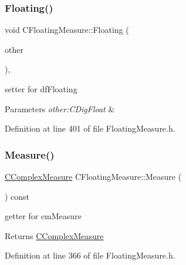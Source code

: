 \subsubsection{\texorpdfstring{Floating()}{Floating()}\hspace{0.1cm}{\footnotesize\ttfamily [2/2]}}
{\footnotesize\ttfamily void C\+Floating\+Measure\+::\+Floating (\begin{DoxyParamCaption}\item[{const \hyperlink{classCDigFloat}{C\+Dig\+Float} \&}]{other }\end{DoxyParamCaption})\hspace{0.3cm}{\ttfamily [inline]}, {\ttfamily [protected]}}



setter for df\+Floating 


\begin{DoxyParams}{Parameters}
{\em other\+:\+C\+Dig\+Float} & \\
\hline
\end{DoxyParams}


Definition at line 401 of file Floating\+Measure.\+h.

\mbox{\label{classCFloatingMeasure_a8ac3af95a2619670a51d744c85b44463}} 
\subsubsection{\texorpdfstring{Measure()}{Measure()}\hspace{0.1cm}{\footnotesize\ttfamily [1/2]}}
{\footnotesize\ttfamily \hyperlink{classCComplexMeasure}{C\+Complex\+Measure} C\+Floating\+Measure\+::\+Measure (\begin{DoxyParamCaption}{ }\end{DoxyParamCaption}) const\hspace{0.3cm}{\ttfamily [inline]}}



getter for cm\+Measure 

\begin{DoxyReturn}{Returns}
\hyperlink{classCComplexMeasure}{C\+Complex\+Measure} 
\end{DoxyReturn}


Definition at line 366 of file Floating\+Measure.\+h.



